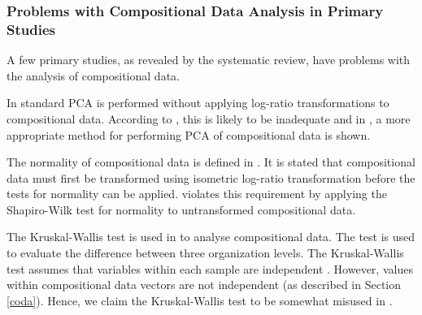 \subsubsection{\label{codaProblems}Problems with Compositional Data Analysis in Primary Studies}

A few primary studies, as revealed by the systematic review, have problems with the analysis of compositional data. 

In \citep{Wohlin2006,Pettersson2008} standard PCA is performed without applying log-ratio transformations to compositional data. According to \citep{Aitchison1983}, this is likely to be inadequate and in \citep{Filzmoser2007}, a more appropriate method for performing PCA of compositional data is shown.

The normality of compositional data is defined in \citep{PawlowskyGlahn2007}. It is stated that compositional data must first be transformed using isometric log-ratio transformation before the tests for normality can be applied. \citep{Jonsson2005a} violates this requirement by applying the Shapiro-Wilk test for normality to untransformed compositional data.

The Kruskal-Wallis test is used in \citep{Jonsson2005a} to analyse compositional data. The test is used to evaluate the  difference between three organization levels. The Kruskal-Wallis test assumes that variables within each sample are independent \citep{Kruskal1952a}. However, values within compositional data vectors are not independent (as described in Section \ref{coda}). Hence, we claim the Kruskal-Wallis test to be somewhat misused in \citep{Jonsson2005a}.